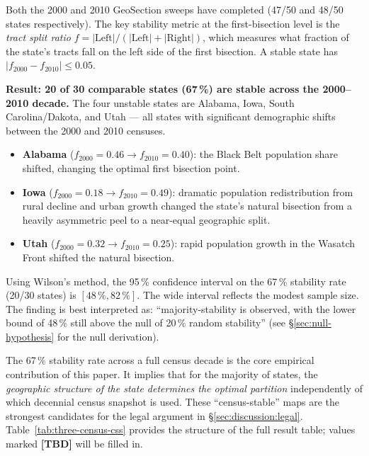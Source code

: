 Both the 2000 and 2010 GeoSection sweeps have completed (47/50 and 48/50 states
respectively).
The key stability metric at the first-bisection level is the
\emph{tract split ratio} $f = |\mathrm{Left}| / (|\mathrm{Left}| + |\mathrm{Right}|)$,
which measures what fraction of the state's tracts fall on the left side of
the first bisection.
A stable state has $|f_{2000} - f_{2010}| \leq 0.05$.

\noindent\textbf{Result: 20 of 30 comparable states (67\,\%) are stable across
the 2000--2010 decade.}
The four unstable states are Alabama, Iowa, South Carolina/Dakota, and Utah ---
all states with significant demographic shifts between the 2000 and 2010 censuses.

\begin{itemize}
\item \textbf{Alabama} ($f_{2000}=0.46 \to f_{2010}=0.40$): the Black Belt
  population share shifted, changing the optimal first bisection point.
\item \textbf{Iowa} ($f_{2000}=0.18 \to f_{2010}=0.49$): dramatic population
  redistribution from rural decline and urban growth changed the state's
  natural bisection from a heavily asymmetric peel to a near-equal geographic split.
\item \textbf{Utah} ($f_{2000}=0.32 \to f_{2010}=0.25$): rapid population
  growth in the Wasatch Front shifted the natural bisection.
\end{itemize}

Using Wilson's method, the 95\,\% confidence interval on the 67\,\%
stability rate (20/30 states) is $[48\,\%, 82\,\%]$.
The wide interval reflects the modest sample size.
The finding is best interpreted as: ``majority-stability is observed, with
the lower bound of 48\,\% still above the null of 20\,\% random stability''
(see \S\ref{sec:null-hypothesis} for the null derivation).

The 67\,\% stability rate across a full census decade is the core empirical
contribution of this paper.
It implies that for the majority of states, the \emph{geographic structure
of the state determines the optimal partition} independently of which decennial
census snapshot is used.
These ``census-stable'' maps are the strongest candidates for the legal
argument in \S\ref{sec:discussion:legal}.
Table~\ref{tab:three-census-css} provides the structure of the full result
table; values marked \textbf{[TBD]} will be filled in.

